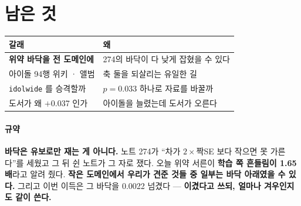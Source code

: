 \documentclass[10pt]{article}
\begin{document}
\section{남은 것}
\begin{center}\footnotesize
\begin{tabular}{ll}
\hline
갈래 & 왜 \\
\hline
\textbf{위약 바닥을 전 도메인에} & 274의 바닥이 다 낮게 잡혔을 수 있다 \\
아이돌 94행 위키 · 앨범 & 축 둘을 되살리는 유일한 길 \\
\texttt{idolwide} 를 승격할까 & $p{=}0.033$ 하나로 자료를 바꿀까 \\
도서가 왜 $+$0.037 인가 & 아이돌을 늘렸는데 도서가 오른다 \\
\hline
\end{tabular}
\end{center}

\paragraph{규약} \textbf{바닥은 유보로만 재는 게 아니다.} 노트 274가
``차가 $2{\times}$짝SE 보다 작으면 못 가른다''를 세웠고 그 뒤 쉰 노트가 그
자로 쟀다. 오늘 위약 서른이 \textbf{학습 쪽 흔들림이 1.65배}라고 알려
줬다. \textbf{작은 도메인에서 우리가 견준 것들 중 일부는 바닥 아래였을 수
있다.} 그리고 이번 이득은 그 바닥을 0.0022 넘겼다 --- \textbf{이겼다고
쓰되, 얼마나 겨우인지도 같이 쓴다.}
\end{document}

